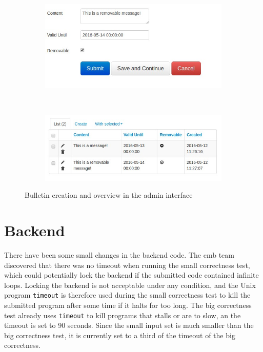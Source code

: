 \begin{figure}
    \centering
    \begin{subfigure}[b]{0.48\textwidth}
        \includegraphics[width=\textwidth]{figs/bulletin_creation.jpg}
    \end{subfigure}
    ~ %
    \begin{subfigure}[b]{0.48\textwidth}
        \includegraphics[width=\textwidth]{figs/bulletin_list.jpg}
    \end{subfigure}
    \caption{Bulletin creation and overview in the admin interface}
    \label{fig:admin-bulletin}
\end{figure}

\section{Backend}
\label{sec:impr-backend}
There have been some small changes in the backend code. The \gls{cmb} team discovered that there was no timeout when running the small correctness test, which could potentially lock the backend if the submitted code contained infinite loops. Locking the backend is not acceptable under any condition, and the Unix program \texttt{timeout} \cite{TIMEOUT} is therefore used during the small correctness test to kill the submitted program after some time if it halts for too long. The big correctness test already uses \texttt{timeout} to kill programs that stalls or are to slow, an the timeout is set to 90 seconds. Since the small input set is much smaller than the big correctness test, it is currently set to a third of the timeout of the big correctness. \\

